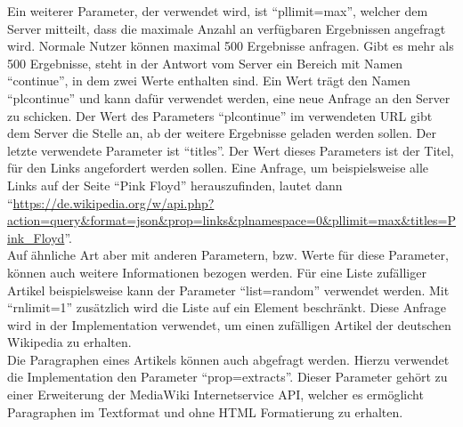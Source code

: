 \documentclass[12pt, a4paper]{article}
\begin{document}
Ein weiterer Parameter, der verwendet wird, ist "`pllimit=max"', welcher dem Server mitteilt, dass die maximale Anzahl an verfügbaren Ergebnissen angefragt wird. Normale Nutzer können maximal 500 Ergebnisse anfragen. Gibt es mehr als 500 Ergebnisse, steht in der Antwort vom Server ein Bereich mit Namen "`continue"', in dem zwei Werte enthalten sind. Ein Wert trägt den Namen "`plcontinue"' und kann dafür verwendet werden, eine neue Anfrage an den Server zu schicken. Der Wert des Parameters "`plcontinue"' im verwendeten URL gibt dem Server die Stelle an, ab der weitere Ergebnisse geladen werden sollen. Der letzte verwendete Parameter ist "`titles"'. Der Wert dieses Parameters ist der Titel, für den Links angefordert werden sollen. Eine Anfrage, um beispielsweise alle Links auf der Seite "`Pink Floyd"' herauszufinden, lautet dann "`\url{https://de.wikipedia.org/w/api.php?action=query&format=json&prop=links&plnamespace=0&pllimit=max&titles=Pink_Floyd}"'.\\

Auf ähnliche Art aber mit anderen Parametern, bzw. Werte für diese Parameter, können auch weitere Informationen bezogen werden. Für eine Liste zufälliger Artikel beispielsweise kann der Parameter "`list=random"' verwendet werden. Mit "`rnlimit=1"' zusätzlich wird die Liste auf ein Element beschränkt. Diese Anfrage wird in der Implementation verwendet, um einen zufälligen Artikel der deutschen Wikipedia zu erhalten.\\

Die Paragraphen eines Artikels können auch abgefragt werden. Hierzu verwendet die Implementation den Parameter "`prop=extracts"'. Dieser Parameter gehört zu einer Erweiterung der MediaWiki Internetservice API, welcher es ermöglicht Paragraphen im Textformat und ohne HTML Formatierung zu erhalten.\\
\end{document}
